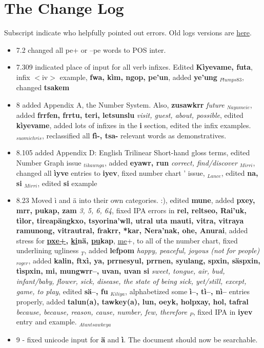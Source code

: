 \documentclass[11pt]{article}
\begin{document}
\section{The Change Log}
Subscript indicate who helpfully pointed out errors. Old logs versions are \href{http://forum.learnnavi.org/intermediate/my-dictionary/}{here}.
\begin{itemize}
\item 7.2 changed all pe+ or --pe words to POS inter.
\item 7.309 indicated place of input for all verb infixes.  Edited {\bf K\`iyevame, futa}, infix $<$iv$>$ example, {\bf fwa, k\`im, ngop, pe'un}, added {\bf *ye'ung} $_{Plumps83}$, changed {\bf tsakem}
\item 8 added Appendix A, the Number System. Also, {\bf zusawkrr} {\it future} $_{Nayumeie}$, added {\bf frrfen, frrtu, teri, letsunslu} {\it visit, guest, about, possible}, edited {\bf k\`iyevame}, added lots of infixes in the {\bf i} section, edited the infix examples. $_{suomichris}$, reclassified all {\bf f\`i-, tsa-} relevant words as demonstratives. 
\item 8.105 added Appendix D: English Trilinear Short-hand gloss terms, edited Number Graph issue $_{tikawnga}$, added {\bf eyawr, run} {\it correct, find/discover} $_{Mirri}$, changed all {\bf \`iyve} entries to {\bf iyev}, fixed number chart ' issue, $_{Lance}$, edited {\bf na, si} $_{Mirri}$, edited {\bf si} example
\item 8.23 Moved \`i and \"a into their own categories. :), edited {\bf mune}, added {\bf pxey, mrr, pukap, zam} {\it 3, 5, 6, 64}, fixed IPA errors in {\bf rel, reltseo, Rai'uk, t\`ilor, tireap\"angkxo, tsyorina'wll, utral uta mauti, vitra, vitraya ramunong, vitrautral, frakrr, *kar, Nera'nak, ohe, Anurai}, added stress for {\bf \uline{pxe+}, \uline{ki}n\"a, \uline{pu}kap}, \uline{me}+, to all of the number chart, fixed underlining ugliness $_{T}$, added {\bf lefpom} {\it happy, peaceful, joyous (not for people)} $_{roger}$, added {\bf kalin, ftx\`i, ya, prrnesyul, prrnen, syulang, spxin, s\"aspxin, t\`ispxin, mi, mungwrr--, uvan, uvan si} {\it sweet, tongue, air, bud, infant/baby, flower, sick, disease, the state of being sick, yet/still, except, game, to play}, edited {\bf s\"a--, fu} $_{Kiliya}$, alphabetized some {\bf \`i--, t\`i--, n\`i--} entries properly, added {\bf talun(a), tawkey(a), lun, oeyk, holpxay, hol, tafral} {\it because, because, reason, cause, number, few, therefore} $_{P}$, fixed IPA in {\bf iyev} entry and example. $_{Atantsawkeya}$
\item 9 - fixed unicode input for {\bf \"a} and {\bf \`i}. The document should now be searchable.

\end{itemize}
\end{document}
